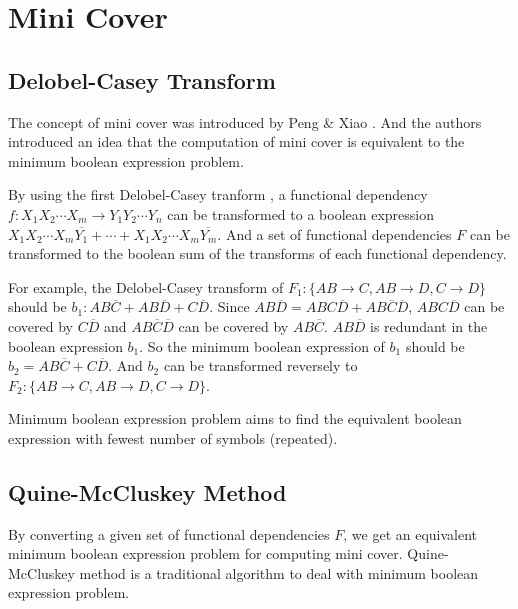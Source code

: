 \documentclass[11pt]{book}
\begin{document}
\section{Mini Cover}

\subsection{Delobel-Casey Transform}

The concept of mini cover was introduced by Peng \& Xiao \cite{peng2016optimal}. And the authors introduced an idea that the computation of mini cover is equivalent to the minimum boolean expression problem.

By using the first Delobel-Casey tranform \cite{delobel1973decomposition}, a functional dependency $f: X_1 X_2 \cdots X_m \rightarrow Y_1 Y_2 \cdots Y_n$ can be transformed to a boolean expression $X_1 X_2 \cdots X_m \overline{Y_1} + \cdots + X_1 X_2 \cdots X_m \overline{Y_m}$. And a set of functional dependencies $F$ can be transformed to the boolean sum of the transforms of each functional dependency.

For example, the Delobel-Casey transform of $F_1: \{ AB \rightarrow C, AB \rightarrow D, C \rightarrow D \}$ should be $b_1: AB\overline{C} + AB\overline{D} + C\overline{D}$. Since $AB\overline{D} = ABC\overline{D} + AB\overline{C}\overline{D}$, $ABC\overline{D}$ can be covered by $C\overline{D}$ and $AB\overline{C}\overline{D}$ can be covered by $AB\overline{C}$. $AB\overline{D}$ is redundant in the boolean expression $b_1$. So the minimum boolean expression of $b_1$ should be $b_2 = AB\overline{C} + C\overline{D}$. And $b_2$ can be transformed reversely to $F_2: \{ AB \rightarrow C, AB \rightarrow D, C \rightarrow D \}$.

Minimum boolean expression problem aims to find the equivalent boolean expression with fewest number of symbols (repeated).

\subsection{Quine-McCluskey Method}

By converting a given set of functional dependencies $F$, we get an equivalent minimum boolean expression problem for computing mini cover. Quine-McCluskey method \cite{mccluskey1956minimization} is a traditional algorithm to deal with minimum boolean expression problem.
\end{document}
